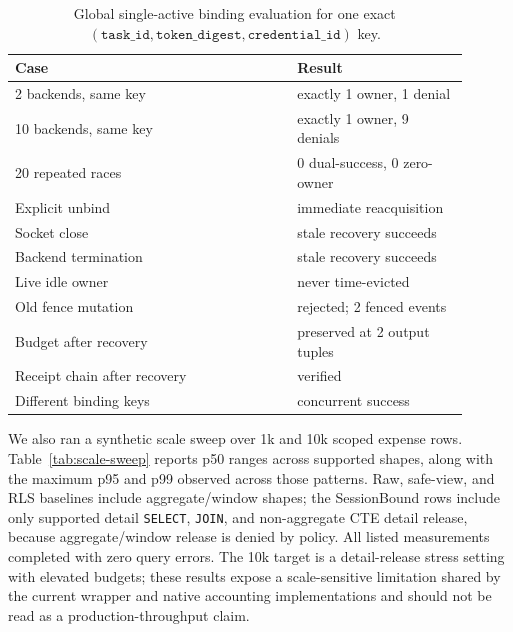 \documentclass[journal]{IEEEtran}
\begin{document}
\begin{table}[!t]
\centering
\scriptsize
\setlength{\tabcolsep}{3pt}
\caption{Global single-active binding evaluation for one exact
\((\texttt{task\_id},\texttt{token\_digest},\texttt{credential\_id})\)
key.}
\label{tab:global-single-active}
\begin{tabular}{@{}p{0.56\linewidth}p{0.34\linewidth}@{}}
\toprule
Case & Result \\
\midrule
2 backends, same key & exactly 1 owner, 1 denial \\
10 backends, same key & exactly 1 owner, 9 denials \\
20 repeated races & 0 dual-success, 0 zero-owner \\
Explicit unbind & immediate reacquisition \\
Socket close & stale recovery succeeds \\
Backend termination & stale recovery succeeds \\
Live idle owner & never time-evicted \\
Old fence mutation & rejected; 2 fenced events \\
Budget after recovery & preserved at 2 output tuples \\
Receipt chain after recovery & verified \\
Different binding keys & concurrent success \\
\bottomrule
\end{tabular}
\end{table}

We also ran a synthetic scale sweep over 1k and 10k scoped expense rows.
Table~\ref{tab:scale-sweep} reports p50 ranges across supported shapes,
along with the maximum p95 and p99 observed across those patterns. Raw,
safe-view, and RLS baselines include aggregate/window shapes; the
SessionBound rows include only supported detail \texttt{SELECT},
\texttt{JOIN}, and non-aggregate CTE detail release, because
aggregate/window release is denied by policy. All listed measurements
completed with zero query errors. The 10k target is a detail-release
stress setting with elevated budgets; these results expose a
scale-sensitive limitation shared by the current wrapper and native
accounting implementations and should not be read as a
production-throughput claim.
\end{document}
